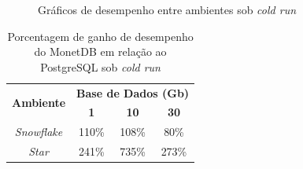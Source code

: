 \begin{figure}[htpb]
        \centering
        \caption{Gráficos de desempenho entre ambientes sob \textit{cold run}}
        \label{fig:qph_model_cold}
\end{figure}

\begin{table}[htpb]
        \centering
        \caption{Porcentagem de ganho de desempenho do MonetDB em relação ao PostgreSQL sob \textit{cold run}}
        \label{tab:ganho_monet_psql_cold}
        \begin{tabular}{|c|c|c|c|}
        \hline
        \multirow{2}{*}{\textbf{Ambiente}} & \multicolumn{3}{c|}{\textbf{Base de Dados (Gb)}} \\ \cline{2-4} 
                                           & \textbf{1}     & \textbf{10}    & \textbf{30}    \\ \hline
        \textit{Snowflake}                 & 110\%          & 108\%          & 80\%           \\ \hline
        \textit{Star}                      & 241\%          & 735\%          & 273\%          \\ \hline
        \end{tabular}
\end{table}

